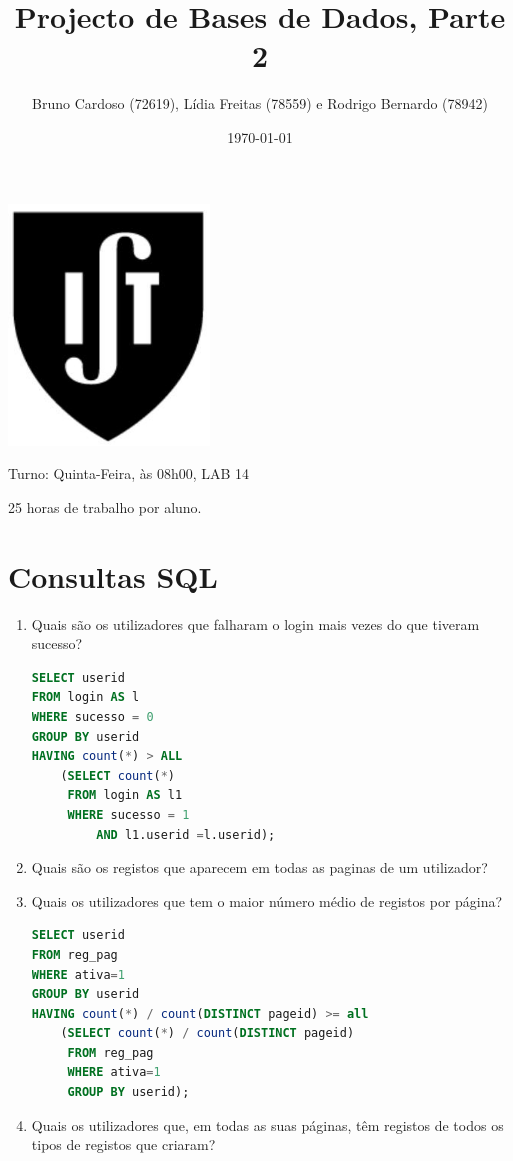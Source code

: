 \documentclass[11pt,a4paper]{article}
\title{\textbf{Projecto de Bases de Dados, Parte 2}}
\author{Bruno Cardoso (72619), Lídia Freitas (78559) e Rodrigo Bernardo (78942)}
\affil{Instituto Superior Técnico}
\begin{document}
\date {\today}

\maketitle

\centerline{\includegraphics[width=0.4\textwidth]{ist-simbolo.jpg}}

\begin{description}[noitemsep]
	\item {}
	\item Turno: Quinta-Feira, às 08h00, LAB 14
	\item 25 horas de trabalho por aluno.
\end{description}

\newpage

\tableofcontents
\newpage

\section{Consultas SQL}
\begin{enumerate}[label=(\alph*)]
	\item Quais são os utilizadores que falharam o login mais vezes do que tiveram sucesso?
		\begin{lstlisting}[language=SQL]
SELECT userid
FROM login AS l
WHERE sucesso = 0
GROUP BY userid
HAVING count(*) > ALL
    (SELECT count(*)
     FROM login AS l1
     WHERE sucesso = 1
         AND l1.userid =l.userid);
		\end{lstlisting}

	\item Quais são os registos que aparecem em todas as paginas de um utilizador?
	\item Quais os utilizadores que tem o maior número médio de registos por página?
		\begin{lstlisting}[language=SQL]
SELECT userid
FROM reg_pag
WHERE ativa=1
GROUP BY userid
HAVING count(*) / count(DISTINCT pageid) >= all
    (SELECT count(*) / count(DISTINCT pageid)
     FROM reg_pag
     WHERE ativa=1
     GROUP BY userid);
		\end{lstlisting}
	
	\item Quais os utilizadores que, em todas as suas páginas, têm registos de todos os tipos de registos que criaram?
\end{enumerate}
\end{document}
